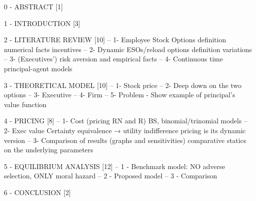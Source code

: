 
0 - ABSTRACT [1]

1 - INTRODUCTION [3]


2 - LITERATURE REVIEW [10]
-- 1- Employee Stock Options
        definition 
        numerical facts
        incentives
-- 2- Dynamic ESOs/reload options
        definition
        variations
-- 3- (Executives') risk aversion and empirical facts
-- 4- Continuous time principal-agent models


3 - THEORETICAL MODEL [10]
-- 1- Stock price
-- 2- Deep down on the two options
-- 3- Executive 
-- 4- Firm 
-- 5- Problem
        - Show example of principal's value function


4 - PRICING [8]
-- 1- Cost (pricing RN and R)
        BS, binomial/trinomial models
-- 2- Exec value
        Certainty equivalence → utility indifference pricing is its dynamic version
-- 3- Comparison of results (graphs and sensitivities)
        comparative statics on the underlying parameters


5 - EQUILIBRIUM ANALYSIS [12]
-- 1 - Benchmark model: NO adverse selection, ONLY moral hazard %
-- 2 - Proposed model %
-- 3 - Comparison 


6 - CONCLUSION [2]